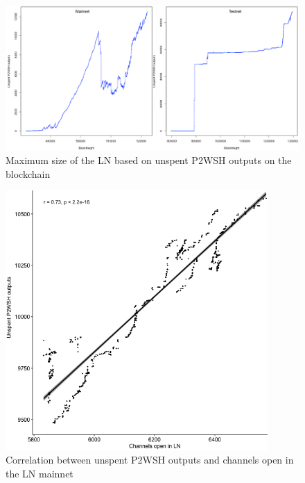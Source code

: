 \begin{figure}[ht]
    \centering
    \includegraphics[width=15cm]{figures/graphs/ln_size_bc.png}
    \caption{Maximum size of the LN based on unspent P2WSH outputs on the blockchain}
    \label{fig:ln_size}
\end{figure}

\begin{figure}[ht]
    \centering
    \includegraphics[width=10cm]{figures/graphs/channel_p2wsh_correlation_mainnnet.png}
    \caption{Correlation between unspent P2WSH outputs and channels open in the LN mainnet}
    \label{fig:correlation}
\end{figure}

